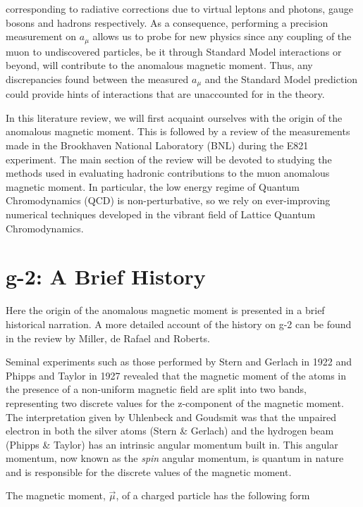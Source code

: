 \documentclass{article}
\numberwithin{equation}{section} %
\begin{document}
\noindent corresponding to radiative corrections due to virtual leptons and photons, gauge bosons and hadrons respectively. As a consequence, performing a precision measurement on $a_\mu$ allows us to probe for new physics since any coupling of the muon to undiscovered particles, be it through Standard Model interactions or beyond, will contribute to the anomalous magnetic moment\cite{fermilab}. Thus, any discrepancies found between the measured $a_\mu$ and the Standard Model prediction could provide hints of interactions that are unaccounted for in the theory. 

In this literature review, we will first acquaint ourselves with the origin of the anomalous magnetic moment. This is followed by a review of the measurements made in the Brookhaven National Laboratory (BNL) during the E821 experiment. The main section of the review will be devoted to studying the methods used in evaluating hadronic contributions to the muon anomalous magnetic moment. In particular, the  low energy  regime of Quantum Chromodynamics (QCD) is non-perturbative,  so we rely on ever-improving numerical techniques developed in the vibrant field of Lattice Quantum Chromodynamics.

\section{g-2: A Brief History}\label{hist}

Here the origin of the anomalous magnetic moment is presented in a brief historical narration. A more detailed account of the history on g-2 can be found in the review by Miller, de Rafael and Roberts\cite{millerg2}.

Seminal experiments such as those performed by Stern and Gerlach in 1922 and Phipps and Taylor in 1927 revealed that the magnetic moment of the atoms in the presence of a non-uniform magnetic field are split into two bands, representing two discrete values for the z-component of the magnetic moment\cite{phipps}. The interpretation given by Uhlenbeck and Goudsmit was that the unpaired electron in both the silver atoms (Stern \& Gerlach) and the hydrogen beam (Phipps \& Taylor) has an intrinsic angular momentum built in. This angular momentum, now known as the \textit{spin} angular momentum, is quantum in nature and is responsible for the discrete values of the magnetic moment.

The magnetic moment, $\vec{\mu}$, of a charged particle has the following form\cite{hoecker}
\end{document}
